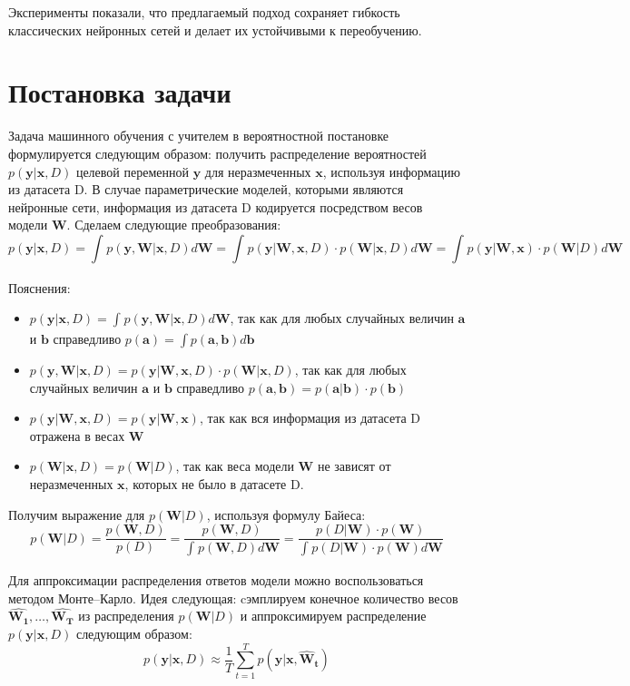\documentclass{article}
\begin{document}
Эксперименты показали, что предлагаемый подход сохраняет гибкость классических нейронных сетей и делает их устойчивыми к переобучению.

\section{Постановка задачи}

Задача машинного обучения с учителем в вероятностной постановке формулируется следующим образом: получить распределение вероятностей $p(\pmb{y} | \pmb{x}, D)$ целевой переменной $\pmb{y}$ для неразмеченных $\pmb{x}$, используя информацию из датасета D. В случае параметрические моделей, которыми являются нейронные сети, информация из датасета D кодируется посредством весов модели $\pmb{W}$. Сделаем следующие преобразования:
\[
 p(\pmb{y} | \pmb{x}, D) =
 \int_{}{} p(\pmb{y}, \pmb{W} | \pmb{x}, D) d \pmb{W} =
 \int_{}{} p(\pmb{y} | \pmb{W}, \pmb{x}, D) \cdot p(\pmb{W} | \pmb{x}, D) d \pmb{W} =
 \int_{}{} p(\pmb{y} | \pmb{W}, \pmb{x}) \cdot p(\pmb{W} | D) d \pmb{W}
\]

Пояснения:
\begin{itemize}
 \item $p(\pmb{y} | \pmb{x}, D) = \int_{}{} p(\pmb{y}, \pmb{W} | \pmb{x}, D) d \pmb{W}$, так как для любых случайных величин $\pmb{a}$ и $\pmb{b}$ справедливо $p(\pmb{a}) = \int p(\pmb{a}, \pmb{b}) d \pmb{b}$
 \item $p(\pmb{y}, \pmb{W} | \pmb{x}, D) = p(\pmb{y} | \pmb{W}, \pmb{x}, D) \cdot p(\pmb{W} | \pmb{x}, D)$, так как для любых случайных величин $\pmb{a}$ и $\pmb{b}$ справедливо $p(\pmb{a}, \pmb{b}) = p(\pmb{a}| \pmb{b}) \cdot p(\pmb{b})$
 \item $p(\pmb{y} | \pmb{W}, \pmb{x}, D) = p(\pmb{y} | \pmb{W}, \pmb{x})$, так как вся информация из датасета D отражена в весах $\pmb{W}$
 \item $p(\pmb{W} | \pmb{x}, D) = p(\pmb{W} | D)$, так как веса модели $\pmb{W}$ не зависят от неразмеченных $\pmb{x}$, которых не было в датасете D.
\end{itemize}

Получим выражение для $p(\pmb{W}| D)$, используя формулу Байеса:
\[
 p(\pmb{W}| D) =
 \dfrac{p(\pmb{W}, D)}{p(D)} =
 \dfrac{p(\pmb{W}, D)}{\int_{}{} p(\pmb{W}, D) d \pmb{W}} =
 \dfrac{p(D | \pmb{W}) \cdot p(\pmb{W})}{\int_{}{} p(D | \pmb{W}) \cdot p(\pmb{W}) d \pmb{W}}
\]

Для аппроксимации распределения ответов модели можно воспользоваться методом Монте--Карло. Идея следующая: cэмплируем конечное количество весов $\hat{\pmb{W_1}}, \dots, \hat{\pmb{W_T}}$ из распределения $p(\pmb{W}| D)$  и аппроксимируем распределение $p(\pmb{y} | \pmb{x}, D)$ следующим образом:
\[
 p(\pmb{y} | \pmb{x}, D)
 \approx \dfrac{1}{T} \sum_{t=1}^{T}{p(\pmb{y} | \pmb{x}, \pmb{\hat{W}_{t}})}
\]
\end{document}
